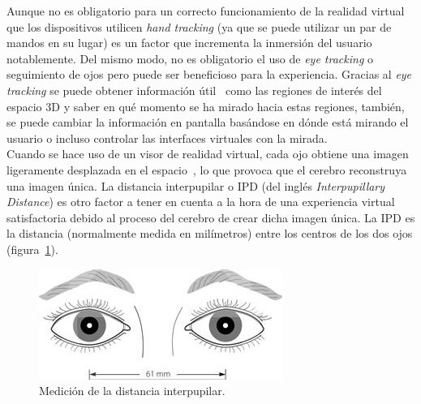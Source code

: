 Aunque no es obligatorio para un correcto funcionamiento de la realidad virtual que los dispositivos utilicen \textit{hand tracking} (ya que se puede utilizar un par de mandos en su lugar) es un factor que incrementa la inmersión del usuario notablemente. Del mismo modo, no es obligatorio el uso de \textit{eye tracking} o seguimiento de ojos pero puede ser beneficioso para la experiencia. Gracias al \textit{eye tracking} se puede obtener información útil~\cite{eyetrackingVR} como las regiones de interés del espacio 3D y saber en qué momento se ha mirado hacia estas regiones, también, se puede cambiar la información en pantalla basándose en dónde está mirando el usuario o incluso controlar las interfaces virtuales con la mirada.\\


Cuando se hace uso de un visor de realidad virtual, cada ojo obtiene una imagen ligeramente desplazada en el espacio\footnotemark~, lo que provoca que el cerebro reconstruya una imagen única. La distancia interpupilar o IPD (del inglés \textit{Interpupillary Distance}) es otro factor a tener en cuenta a la hora de una experiencia virtual satisfactoria debido al proceso del cerebro de crear dicha imagen única. La IPD es la distancia (normalmente medida en milímetros) entre los centros de los dos ojos (figura~\ref{fig:IPDExample}).




\begin{figure}[H]
    \centering
    \includegraphics[scale=1]{Images/Estado del arte/IPD.jpg}
    \caption[Medición de la distancia interpupilar]{Medición de la distancia interpupilar\footnotemark.}
    \label{fig:IPDExample}
\end{figure}


